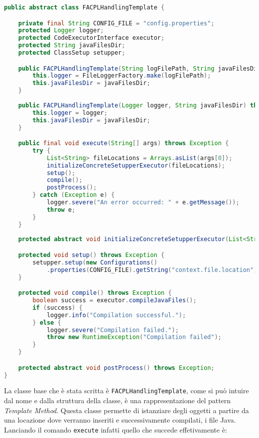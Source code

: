 \begin{lstlisting}[language=Java, caption=Classe FACPLHandlingTemplate, label=code:FACPLHandlingTemplate, basicstyle=\fontsize{8.5}{10}\ttfamily]
public abstract class FACPLHandlingTemplate {

	private final String CONFIG_FILE = "config.properties";
    protected Logger logger;
    protected CodeExecutorInterface executor;
    protected String javaFilesDir;
    protected ClassSetup setupper;

    public FACPLHandlingTemplate(String logFilePath, String javaFilesDir) throws IOException {
        this.logger = FileLoggerFactory.make(logFilePath);
        this.javaFilesDir = javaFilesDir;
    }
    
    public FACPLHandlingTemplate(Logger logger, String javaFilesDir) throws IOException {
        this.logger = logger;
        this.javaFilesDir = javaFilesDir;
    }

    public final void execute(String[] args) throws Exception {
        try {
            List<String> fileLocations = Arrays.asList(args[0]);
            initializeConcreteSetupperExecutor(fileLocations);
            setup();
            compile();
            postProcess();
        } catch (Exception e) {
            logger.severe("An error occurred: " + e.getMessage());
            throw e;
        }
    }
    
    protected abstract void initializeConcreteSetupperExecutor(List<String> fileLocations) throws Exception;

    protected void setup() throws Exception {
        setupper.setup(new Configurations()
            .properties(CONFIG_FILE).getString("context.file.location"), javaFilesDir);
    }

    protected void compile() throws Exception {
        boolean success = executor.compileJavaFiles();
        if (success) {
            logger.info("Compilation successful.");
        } else {
            logger.severe("Compilation failed.");
            throw new RuntimeException("Compilation failed");
        }
    }

    protected abstract void postProcess() throws Exception;
}
\end{lstlisting}
La classe base che è stata scritta è \texttt{FACPLHandlingTemplate}, come si può intuire dal nome e dalla struttura della classe, è una rappresentazione del pattern \emph{Template Method}\cite{GOF}. Questa classe permette di istanziare degli oggetti a partire da una locazione dove verranno inseriti e successivamente compilati, i file Java. Lanciando il comando \texttt{execute} infatti quello che succede effetivamente è:
